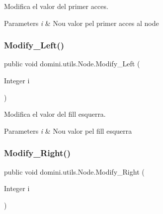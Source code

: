 Modifica el valor del primer acces. 


\begin{DoxyParams}{Parameters}
{\em i} & Nou valor pel primer acces al node \\
\hline
\end{DoxyParams}
\mbox{\label{classdomini_1_1utils_1_1Node_a5a1cbd1e7f1fd78b42050f563520a709}} 
\subsubsection{\texorpdfstring{Modify\+\_\+\+Left()}{Modify\_Left()}}
{\footnotesize\ttfamily public void domini.\+utils.\+Node.\+Modify\+\_\+\+Left (\begin{DoxyParamCaption}\item[{Integer}]{i }\end{DoxyParamCaption})\hspace{0.3cm}{\ttfamily [inline]}}



Modifica el valor del fill esquerra. 


\begin{DoxyParams}{Parameters}
{\em i} & Nou valor pel fill esquerra \\
\hline
\end{DoxyParams}
\mbox{\label{classdomini_1_1utils_1_1Node_a58d22f8330339b6d807cdef44d0eddf6}} 
\subsubsection{\texorpdfstring{Modify\+\_\+\+Right()}{Modify\_Right()}}
{\footnotesize\ttfamily public void domini.\+utils.\+Node.\+Modify\+\_\+\+Right (\begin{DoxyParamCaption}\item[{Integer}]{i }\end{DoxyParamCaption})\hspace{0.3cm}{\ttfamily [inline]}}



